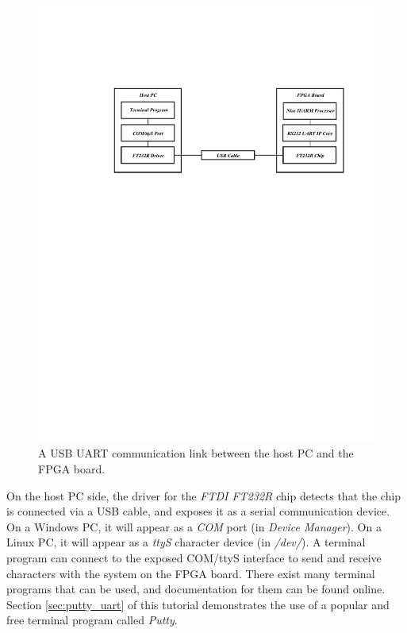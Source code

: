\documentclass[11pt, twoside, pdftex]{article}
\begin{document}
\begin{figure}[h!]
   \begin{center}
       \includegraphics[scale=1.0]{figures/fig_usb_uart_communication_link.pdf}
   \end{center}
   \caption{A USB UART communication link between the host PC and the FPGA board.}
	\label{fig:usb_uart_communication_link}
\end{figure}

On the host PC side, the driver for the \textit{FTDI FT232R} chip detects that the chip is connected via a USB cable, and exposes it as a serial communication device. On a Windows PC, it will appear as a \textit{COM} port (in \textit{Device Manager}). On a Linux PC, it will appear as a \textit{ttyS} character device (in \textit{/dev/}). A terminal program can connect to the exposed COM/ttyS interface to send and receive characters with the system on the FPGA board. There exist many terminal programs that can be used, and documentation for them can be found online. Section \ref{sec:putty_uart} of this tutorial demonstrates the use of a popular and free terminal program called \textit{Putty}.
\end{document}
